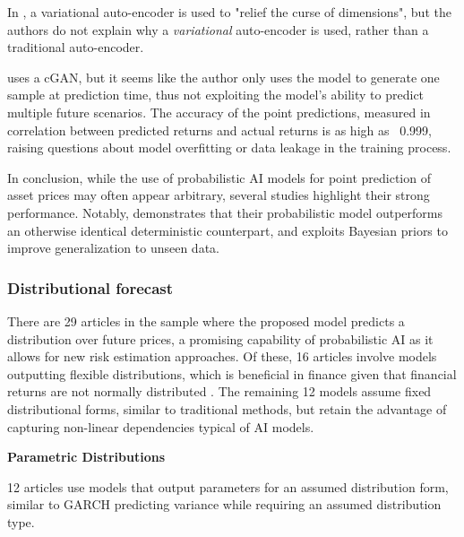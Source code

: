 In \textcite{li2020multivariate}, a variational auto-encoder is used to "relief the curse of dimensions", but the authors do not explain why a \textit{variational} auto-encoder is used, rather than a traditional auto-encoder.

\textcite{salama2024gan} uses a cGAN, but it seems like the author only uses the model to generate one sample at prediction time, thus not exploiting the model's ability to predict multiple future scenarios. The accuracy of the point predictions, measured in correlation between predicted returns and actual returns is as high as ~0.999, raising questions about model overfitting or data leakage in the training process.

In conclusion, while the use of probabilistic AI models for point prediction of asset prices may often appear arbitrary, several studies highlight their strong performance. Notably, \textcite{Daniali2021} demonstrates that their probabilistic model outperforms an otherwise identical deterministic counterpart, and \textcite{jang2018generative} exploits Bayesian priors to improve generalization to unseen data.

\subsubsection{Distributional forecast}
\label{sec:distribution}
There are 29 articles in the sample where the proposed model predicts a distribution over future prices, a promising capability of probabilistic AI as it allows for new risk estimation approaches. Of these, 16 articles involve models outputting flexible distributions, which is beneficial in finance given that financial returns are not normally distributed \textcite{Peir1994TheDO}. The remaining 12 models assume fixed distributional forms, similar to traditional methods, but retain the advantage of capturing non-linear dependencies typical of AI models.

\textbf{Parametric Distributions}

12 articles use models that output parameters for an assumed distribution form, similar to GARCH predicting variance while requiring an assumed distribution type.

